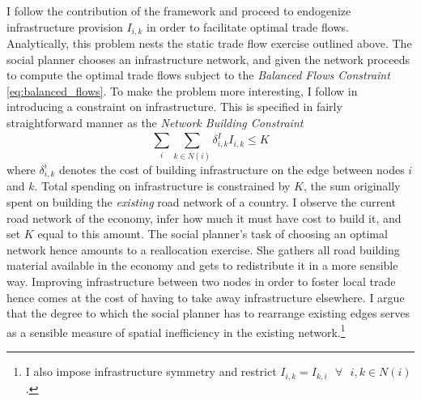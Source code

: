 \documentclass[11pt, oneside]{article}   	%
\begin{document}
I follow the contribution of the \cite{Fajgelbaum_OptimalTransportNetworks_2017} framework and proceed to endogenize infrastructure provision $I_{i,k}$ in order to facilitate optimal trade flows. Analytically, this problem nests the static trade flow exercise outlined above. The social planner chooses an infrastructure network, and given the network proceeds to compute the optimal trade flows subject to the \emph{Balanced Flows Constraint} \eqref{eq:balanced_flows}. To make the problem more interesting, I follow \citeauthor{Fajgelbaum_OptimalTransportNetworks_2017} in introducing a constraint on infrastructure. This is specified in fairly straightforward manner as the \emph{Network Building Constraint}
\begin{equation}
  \sum_{i}^{}\sum_{k\in N(i)}^{}\delta^{I}_{i,k}I_{i,k} \leq K
  \label{eq:network_building}
\end{equation}
where $\delta^{i}_{i,k}$ denotes the cost of building infrastructure on the edge between nodes $i$ and $k$. Total spending on infrastructure is constrained by $K$, the sum originally spent on building the \emph{existing} road network of a country. I observe the current road network of the economy, infer how much it must have cost to build it, and set $K$ equal to this amount. The social planner's task of choosing an optimal network hence amounts to a reallocation exercise. She gathers all road building material available in the economy and gets to redistribute it in a more sensible way. Improving infrastructure between two nodes in order to foster local trade hence comes at the cost of having to take away infrastructure elsewhere. I argue that the degree to which the social planner has to rearrange existing edges serves as a sensible measure of spatial inefficiency in the existing network.\footnote{I also impose infrastructure symmetry and restrict $I_{i,k} = I_{k,i} \textrm{ } \forall \textrm{ } i,k\in N(i)$.}
\end{document}
